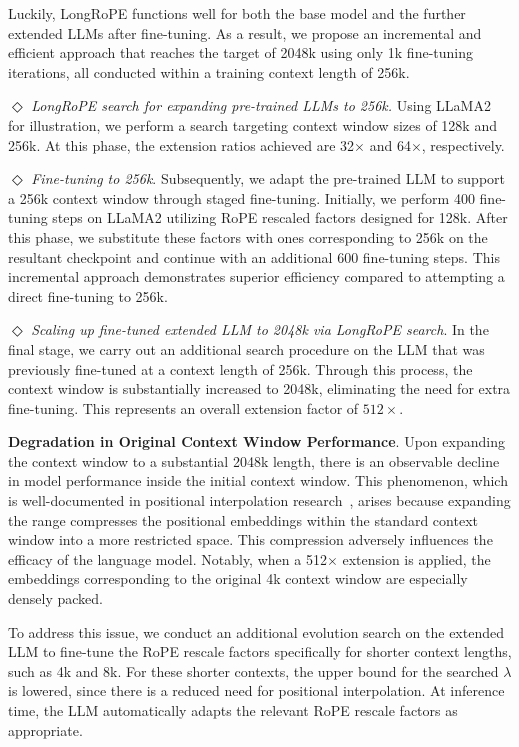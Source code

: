 Luckily, LongRoPE functions well for both the base model and the further extended LLMs after fine-tuning. As a result, we propose an incremental and efficient approach that reaches the target of 2048k using only 1k fine-tuning iterations, all conducted within a training context length of 256k.

$\Diamond$ \textit{LongRoPE search for expanding pre-trained LLMs to 256k.} Using LLaMA2 for illustration, we perform a search targeting context window sizes of 128k and 256k. At this phase, the extension ratios achieved are 32$\times$ and 64$\times$, respectively.

$\Diamond$ \textit{Fine-tuning to 256k}. Subsequently, we adapt the pre-trained LLM to support a 256k context window through staged fine-tuning. Initially, we perform 400 fine-tuning steps on LLaMA2 utilizing RoPE rescaled factors designed for 128k. After this phase, we substitute these factors with ones corresponding to 256k on the resultant checkpoint and continue with an additional 600 fine-tuning steps. This incremental approach demonstrates superior efficiency compared to attempting a direct fine-tuning to 256k.

$\Diamond$ \textit{Scaling up fine-tuned extended LLM to 2048k via LongRoPE search}. In the final stage, we carry out an additional search procedure on the LLM that was previously fine-tuned at a context length of 256k. Through this process, the context window is substantially increased to 2048k, eliminating the need for extra fine-tuning. This represents an overall extension factor of $512\times$.

\textbf{Degradation in Original Context Window Performance}.  Upon expanding the context window to a substantial 2048k length, there is an observable decline in model performance inside the initial context window. This phenomenon, which is well-documented in positional interpolation research~\cite{pi}, arises because expanding the range compresses the positional embeddings within the standard context window into a more restricted space. This compression adversely influences the efficacy of the language model. Notably, when a 512$\times$ extension is applied, the embeddings corresponding to the original 4k context window are especially densely packed.

To address this issue, we conduct an additional evolution search on the extended LLM to fine-tune the RoPE rescale factors specifically for shorter context lengths, such as 4k and 8k. For these shorter contexts, the upper bound for the searched $\lambda$ is lowered, since there is a reduced need for positional interpolation. At inference time, the LLM automatically adapts the relevant RoPE rescale factors as appropriate.

